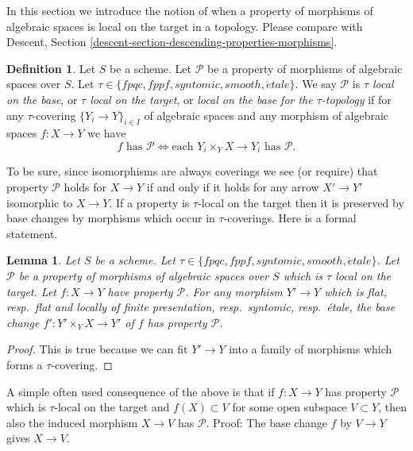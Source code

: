 \documentclass{stacks-project}
\theoremstyle{plain}
\newtheorem{lemma}[subsection]{Lemma}
\theoremstyle{definition}
\newtheorem{definition}[subsection]{Definition}
\theoremstyle{remark}
\numberwithin{equation}{subsection}
\def\etale{{\acute{e}tale}}
\begin{document}
\noindent
In this section we introduce the notion of when a property of morphisms of
algebraic spaces is local on the target in a topology. Please compare with
Descent, Section \ref{descent-section-descending-properties-morphisms}.

\begin{definition}
\label{definition-property-morphisms-local}
Let $S$ be a scheme.
Let $\mathcal{P}$ be a property of morphisms of algebraic spaces over $S$.
Let $\tau \in \{fpqc, fppf, syntomic, smooth, \etale\}$.
We say $\mathcal{P}$ is {\it $\tau$ local on the base}, or
{\it $\tau$ local on the target}, or
{\it local on the base for the $\tau$-topology} if for any
$\tau$-covering $\{Y_i \to Y\}_{i \in I}$ of algebraic spaces
and any morphism of algebraic spaces $f : X \to Y$ we
have
$$
f \text{ has }\mathcal{P}
\Leftrightarrow
\text{each }Y_i \times_Y X \to Y_i\text{ has }\mathcal{P}.
$$
\end{definition}

\noindent
To be sure, since isomorphisms are always coverings
we see (or require) that property $\mathcal{P}$ holds for $X \to Y$
if and only if it holds for any arrow $X' \to Y'$ isomorphic to $X \to Y$.
If a property is $\tau$-local on the target then it is preserved
by base changes by morphisms which occur in $\tau$-coverings. Here
is a formal statement.

\begin{lemma}
\label{lemma-pullback-property-local-target}
Let $S$ be a scheme.
Let $\tau \in \{fpqc, fppf, syntomic, smooth, \etale\}$.
Let $\mathcal{P}$ be a property of morphisms of algebraic spaces over $S$
which is $\tau$ local on the target. Let $f : X \to Y$ have property
$\mathcal{P}$. For any morphism $Y' \to Y$ which is
flat, resp.\ flat and locally of finite presentation, resp.\ syntomic,
resp.\ \'etale, the base change
$f' : Y' \times_Y X \to Y'$ of $f$ has property $\mathcal{P}$.
\end{lemma}

\begin{proof}
This is true because we can fit $Y' \to Y$ into a family of
morphisms which forms a $\tau$-covering.
\end{proof}

\noindent
A simple often used consequence of the above is that if
$f : X \to Y$ has property $\mathcal{P}$ which is $\tau$-local
on the target and $f(X) \subset V$
for some open subspace $V \subset Y$, then also the induced
morphism $X \to V$ has $\mathcal{P}$. Proof: The base change
$f$ by $V \to Y$ gives $X \to V$.
\end{document}
